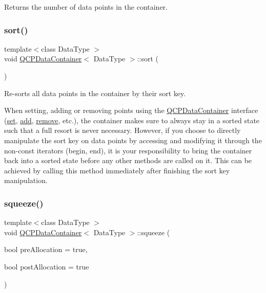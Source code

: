 Returns the number of data points in the container. \mbox{\label{class_q_c_p_data_container_a75da92e33063b63d6da5014683591d45}} 
\subsubsection{\texorpdfstring{sort()}{sort()}}
{\footnotesize\ttfamily template$<$class Data\+Type $>$ \\
void \hyperlink{class_q_c_p_data_container}{Q\+C\+P\+Data\+Container}$<$ Data\+Type $>$\+::sort (\begin{DoxyParamCaption}{ }\end{DoxyParamCaption})}

Re-\/sorts all data points in the container by their sort key.

When setting, adding or removing points using the \hyperlink{class_q_c_p_data_container}{Q\+C\+P\+Data\+Container} interface (\hyperlink{class_q_c_p_data_container_ae7042bd534fc3ce7befa2ce3f790b5bf}{set}, \hyperlink{class_q_c_p_data_container_a42b98bd994307ccd163a43d576f91ad9}{add}, \hyperlink{class_q_c_p_data_container_ae5f569a120648b167efa78835f12fd38}{remove}, etc.), the container makes sure to always stay in a sorted state such that a full resort is never necessary. However, if you choose to directly manipulate the sort key on data points by accessing and modifying it through the non-\/const iterators (begin, end), it is your responsibility to bring the container back into a sorted state before any other methods are called on it. This can be achieved by calling this method immediately after finishing the sort key manipulation. \mbox{\label{class_q_c_p_data_container_a82fcc511def22287fc62579d0706387c}} 
\subsubsection{\texorpdfstring{squeeze()}{squeeze()}}
{\footnotesize\ttfamily template$<$class Data\+Type $>$ \\
void \hyperlink{class_q_c_p_data_container}{Q\+C\+P\+Data\+Container}$<$ Data\+Type $>$\+::squeeze (\begin{DoxyParamCaption}\item[{bool}]{pre\+Allocation = {\ttfamily true},  }\item[{bool}]{post\+Allocation = {\ttfamily true} }\end{DoxyParamCaption})}

